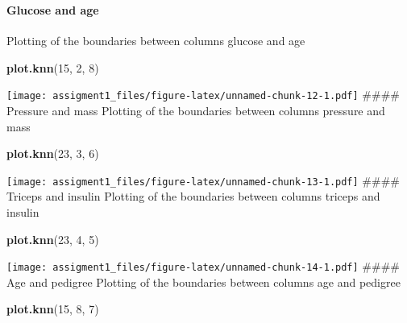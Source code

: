 \documentclass[
]{article}
\newenvironment{Shaded}{\begin{snugshade}}{\end{snugshade}}
\newcommand{\DecValTok}[1]{\textcolor[rgb]{0.00,0.00,0.81}{#1}}
\newcommand{\KeywordTok}[1]{\textcolor[rgb]{0.13,0.29,0.53}{\textbf{#1}}}
\newcommand{\NormalTok}[1]{#1}
\begin{document}
\hypertarget{section-1}{%
\subsubsection{}\label{section-1}}

\hypertarget{glucose-and-age}{%
\paragraph{Glucose and age}\label{glucose-and-age}}

Plotting of the boundaries between columns glucose and age

\begin{Shaded}
\begin{Highlighting}[]
\KeywordTok{plot.knn}\NormalTok{(}\DecValTok{15}\NormalTok{, }\DecValTok{2}\NormalTok{, }\DecValTok{8}\NormalTok{)}
\end{Highlighting}
\end{Shaded}

\texttt{[image: assigment1\_files/figure-latex/unnamed-chunk-12-1.pdf]}
\#\#\#\# Pressure and mass Plotting of the boundaries between columns
pressure and mass

\begin{Shaded}
\begin{Highlighting}[]
\KeywordTok{plot.knn}\NormalTok{(}\DecValTok{23}\NormalTok{, }\DecValTok{3}\NormalTok{, }\DecValTok{6}\NormalTok{)}
\end{Highlighting}
\end{Shaded}

\texttt{[image: assigment1\_files/figure-latex/unnamed-chunk-13-1.pdf]}
\#\#\#\# Triceps and insulin Plotting of the boundaries between columns
triceps and insulin

\begin{Shaded}
\begin{Highlighting}[]
\KeywordTok{plot.knn}\NormalTok{(}\DecValTok{23}\NormalTok{, }\DecValTok{4}\NormalTok{, }\DecValTok{5}\NormalTok{)}
\end{Highlighting}
\end{Shaded}

\texttt{[image: assigment1\_files/figure-latex/unnamed-chunk-14-1.pdf]}
\#\#\#\# Age and pedigree Plotting of the boundaries between columns age
and pedigree

\begin{Shaded}
\begin{Highlighting}[]
\KeywordTok{plot.knn}\NormalTok{(}\DecValTok{15}\NormalTok{, }\DecValTok{8}\NormalTok{, }\DecValTok{7}\NormalTok{)}
\end{Highlighting}
\end{Shaded}
\end{document}
